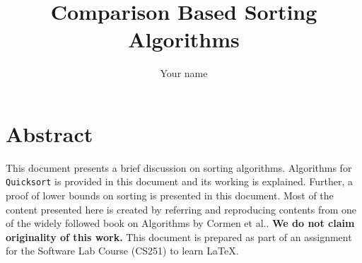 \documentclass[twocolumn,a4paper]{article}
\title{Comparison Based Sorting Algorithms}
\author{Your name}
\date{}
\begin{document}
    \maketitle

    \fontsize{10pt}{11.9pt}\selectfont

    \section*{Abstract}
        This document presents a brief discussion on sorting algorithms.
        Algorithms for \texttt{Quicksort} is provided in this document and its working is explained.
        Further, a proof of lower bounds on sorting is presented in this document.
        Most of the content presented here is created by referring and reproducing contents from one of the widely followed book on Algorithms by Cormen et al.\cite{clrs}.
        \textbf{We do not claim originality of this work.} This document is prepared as part of an assignment for the Software Lab Course (CS251) to learn \LaTeX.\\

    \vspace{-0.2mm}
\end{document}
